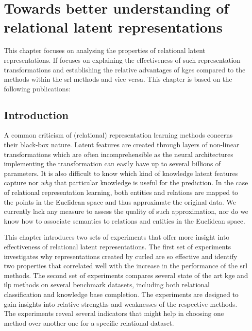 \chapter{Towards better understanding of relational latent representations}\label{ch:embeddinganalysis}


This chapter focuses on analysing the properties of relational latent representations.
If focuses on explaining the effectiveness of such representation transformations and establishing the relative advantages of \gls{kge}s compared to the methods within the \gls{srl} methods and vice versa.
This chapter is based on the following publications:

\begin{quote}
\end{quote}


\begin{quote}
\end{quote}

\begin{quote}
\end{quote}

\section{Introduction}





A common criticism of  (relational) representation learning methods concerns their black-box nature.
Latent features are created through layers of non-linear transformations which are often incomprehensible as the neural architectures implementing the transformation can easily have up to several billions of parameters.
It is also difficult to know which kind of knowledge latent features capture nor \textit{why} that particular knowledge is useful for the prediction.
In the case of relational representation learning, both entities and relations are mapped to the points in the Euclidean space and thus approximate the original data.
We currently lack any measure to assess the quality of such approximation, nor do we know how to associate semantics to relations and entities in the Euclidean space.



This chapter introduces two sets of experiments that offer more insight into effectiveness of relational latent representations.
The first set of experiments investigates why representations created by \gls{curled} are so effective and identify two properties that correlated well with the increase in the performance of the \gls{srl} methods.
The second set of experiments compares several state of the art \gls{kge} and \gls{ilp} methods on several benchmark datasets, including both relational classification and knowledge base completion.
The experiments are designed to gain insights into relative strengths and weaknesses of the respective methods.
The experiments reveal several indicators that might help in choosing one method over another one for a specific  relational dataset.






